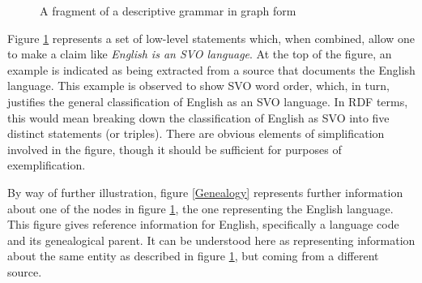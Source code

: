 \documentclass[12pt]{article}
\newcommand{\fref}[1]{figure \ref{#1}}
\begin{document}
\begin{figure}[ht]
\centering
{}
\caption{A fragment of a descriptive grammar in graph form \label{Analysis}}
\end{figure}

\nocite{QuirkEtAl:1985}

Figure \ref{Analysis} represents a set of low-level statements which, when
combined, allow one to make a claim like \emph{English is an SVO language}. At
the top of the figure, an example is indicated as being extracted from a source
that documents the English language. This example is observed to show SVO word
order, which, in turn, justifies the general classification of English as an SVO
language. In RDF terms, this would mean breaking down the classification of
English as SVO into five distinct statements (or triples). There are obvious
elements of simplification involved in the figure, though it should be
sufficient for purposes of exemplification.

By way of further illustration, figure \ref{Genealogy} represents further
information about one of the nodes in \fref{Analysis}, the one representing the
English language. This figure gives reference information for English,
specifically a language code and its genealogical parent. It can be understood
here as representing information about the same entity as described in
\fref{Analysis}, but coming from a different source.
\end{document}
